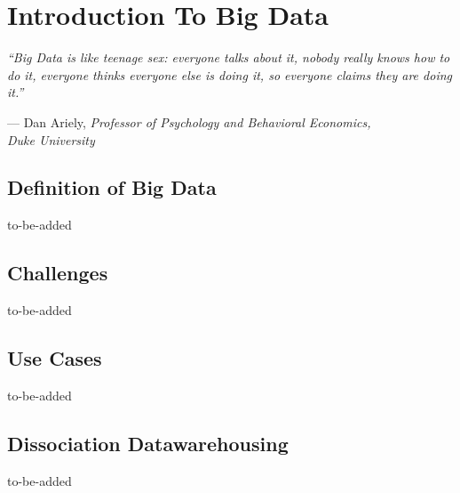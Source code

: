 \chapter{Introduction To Big Data}
\label{chapter_bigdata}
\setlength{\epigraphwidth}{0.95\textwidth}
\setlength\epigraphrule{0pt}
\epigraph{\itshape ``Big Data is like teenage sex: everyone talks about it, nobody really knows how to do it, everyone thinks everyone else is doing it, so everyone claims they are doing it.''}{--- Dan Ariely, \textit{Professor of Psychology and Behavioral Economics,\\ Duke University}}


\section{Definition of Big Data}
\label{bd_def}
to-be-added

\section{Challenges}
\label{bd_def}
to-be-added

\section{Use Cases}
\label{bd_def}
to-be-added

\section{Dissociation Datawarehousing}
\label{bd_def}
to-be-added